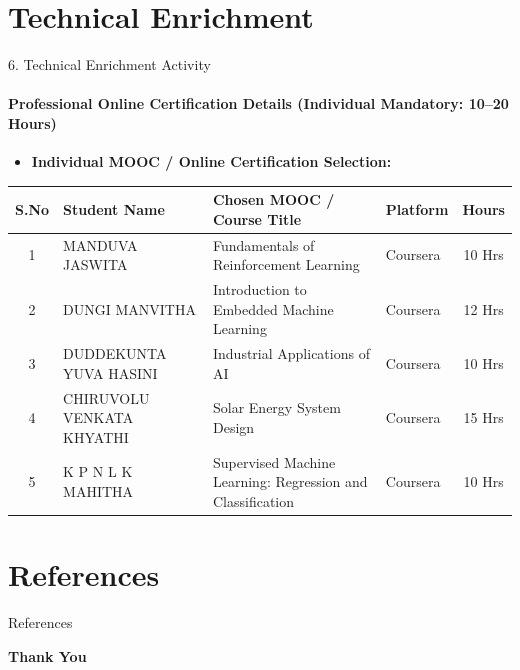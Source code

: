 \documentclass[aspectratio=169, 11pt]{beamer}
\begin{document}
\section{Technical Enrichment}

\begin{frame}{6. Technical Enrichment Activity}
    \framesubtitle{Professional Online Certification Details (Individual Mandatory: 10--20 Hours)}
    \begin{itemize}
        \item \textbf{Individual MOOC / Online Certification Selection:}
    \end{itemize}
    \vspace{-0.1cm}
\begin{table}
    \centering
    \footnotesize
    \renewcommand{\arraystretch}{1.15}
    \begin{tabular}{|c|p{2.8cm}|p{5.0cm}|p{2.3cm}|c|}
        \hline
        \textbf{S.No} & \textbf{Student Name} & \textbf{Chosen MOOC / Course Title} & \textbf{Platform} & \textbf{Hours} \\
        \hline
        1 & MANDUVA JASWITA & Fundamentals of Reinforcement Learning & Coursera & 10 Hrs \\
        \hline
        2 & DUNGI MANVITHA & Introduction to Embedded Machine Learning & Coursera & 12 Hrs \\
        \hline
        3 & DUDDEKUNTA YUVA HASINI & Industrial Applications of AI & Coursera & 10 Hrs \\
        \hline
        4 & CHIRUVOLU VENKATA KHYATHI & Solar Energy System Design & Coursera & 15 Hrs \\
        \hline
        5 & K P N L K MAHITHA & Supervised Machine Learning: Regression and Classification & Coursera & 10 Hrs \\
        \hline
    \end{tabular}
\end{table}
\end{frame}

\section{References}
\begin{frame}[allowframebreaks]{References}
    \tiny
    
    
\end{frame}

\begin{frame}
    \centering
    {\Huge \textbf{\textcolor{amritaMaroon}{Thank You}}}
\end{frame}
\end{document}
